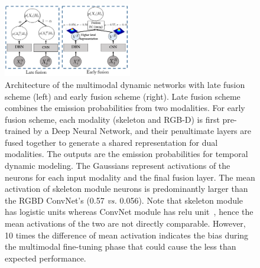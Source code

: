 \begin{figure}[t]
  \centering
  \includegraphics[width=0.5\textwidth]{images/Fusion_combined}
  \caption{
    Architecture of the multimodal dynamic networks with late fusion scheme (left) and early fusion scheme (right).  Late fusion scheme combines the emission probabilities from two modalities. For early fusion scheme, each modality (skeleton and RGB-D) is first pre-trained by a Deep Neural Network, and their penultimate layers are fused together to generate a shared representation for dual modalities. The outputs are the emission probabilities \emissionprob for temporal dynamic modeling. The Gaussians represent activations of the neurons for each input modality and the final fusion layer. The mean activation of skeleton module neurons is predominantly larger than the RGBD ConvNet's (0.57 \emph{vs.} 0.056). Note that skeleton module has logistic units whereas ConvNet module has relu unit~\cite{DBLP:journals/corr/PigouODHD15}, hence the mean activations of the two are not directly comparable. However, 10 times the difference of mean activation indicates the bias during the multimodal fine-tuning phase that could cause the less than expected performance.
  }\label{fig:fusion}
\end{figure}



\endinput
